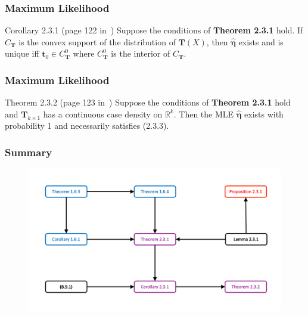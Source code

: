 \documentclass[serif,mathserif,professionalfont]{beamer}
\begin{document}
\begin{frame}
	
	\frametitle{Maximum Likelihood}
	
	\begin{block}{Corollary 2.3.1 (page 122 in~\cite{BD2015})}
		Suppose the conditions of \textbf{Theorem 2.3.1} hold. If $ C_{\bm{T}} $ is the convex support of the distribution of $ \bm{T}\left(X \right) $, then $ \widehat{\boldsymbol{\eta}} $ exists and is unique iff $ \bm{t}_0 \in C_{\bm{T}}^0 $ where $ C_{\bm{T}}^0 $ is the interior of $ C_{\bm{T}} $.
	\end{block}
	
\end{frame}




\begin{frame}
	
	\frametitle{Maximum Likelihood}
	
	\begin{block}{Theorem 2.3.2 (page 123 in~\cite{BD2015})}
		Suppose the conditions of \textbf{Theorem 2.3.1} hold and $ \bm{T}_{k \times 1} $ has a continuous case density on $ \mathbb{R}^k $. Then the MLE $ \widehat{\boldsymbol{\eta}} $ exists with probability 1 and necessarily satisfies (2.3.3).
	\end{block}

	
\end{frame}



\begin{frame}
	
	\frametitle{Summary}
	
	\begin{figure}
		\includegraphics[width=1\linewidth]{W5F1}
	\end{figure}
	
	
\end{frame}
\end{document}
